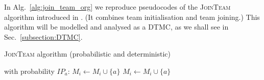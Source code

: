 \documentclass{llncs}
\newcommand{\comment}[1]{\marginpar{\footnotesize \color{red} \textsf{#1}}}
\begin{document}


In Alg.~\ref{alg:join_team_org} we reproduce pseudocodes of the \textsc{JoinTeam} algorithm introduced in \cite{gaston2005agent}. (It combines team initialisation and team joining.) %
This algorithm will be modelled and analysed as a DTMC, as we shall see in Sec.~\ref{subsection:DTMC}.

\vspace{-6mm}

\begin{algorithm}[H]
\caption{\textsc{JoinTeam} algorithm \cite{gaston2005agent} (probabilistic and deterministic)}
\label{alg:join_team_org}
\begin{scriptsize}
\begin{algorithmic} 
     
       
	 
	  \State with probability $IP_a$: $M_i \leftarrow M_i \cup \{a\}$ 
	\EndIf
       
	 
	  \State $M_i \leftarrow M_i \cup \{a\}$ 
	\EndIf
      \EndIf
    \EndIf
  \EndFor
\EndProcedure
\end{algorithmic}
\end{scriptsize}
\end{algorithm}
\vspace{-6mm}
%
\end{document}
